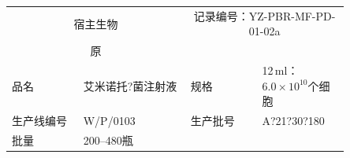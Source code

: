 \documentclass[UTF8,10pt,a4paper,fontset=fandol]{ctexart}
\newcommand{\fieldvalue}[1]{#1}
\newcommand{\handwritten}[1]{#1}
\begin{document}
\noindent
\begin{tabular}{|p{0.18\linewidth}|p{0.27\linewidth}|p{0.18\linewidth}|p{0.22\linewidth}|}
\hline
\multicolumn{2}{|c|}{宿主生物} & \multicolumn{2}{c|}{记录编号：YZ-PBR-MF-PD-01-02a} \\
\multicolumn{2}{|c|}{%
\fieldvalue{原}} &
\multicolumn{2}{c|}{} \\
\hline
品名 &
\fieldvalue{艾米诺托?菌注射液} &
规格 &
\fieldvalue{12\,ml：$6.0\times10^{10}$个细胞} \\
\hline
生产线编号 &
\fieldvalue{\handwritten{W/P/0103}} &
生产批号 &
\fieldvalue{\handwritten{A?21?30?180}} \\
\hline
批量 &
\fieldvalue{200--480瓶} &
\multicolumn{2}{c|}{} \\
\hline
\end{tabular}

\vspace{0.5em}
\end{document}
